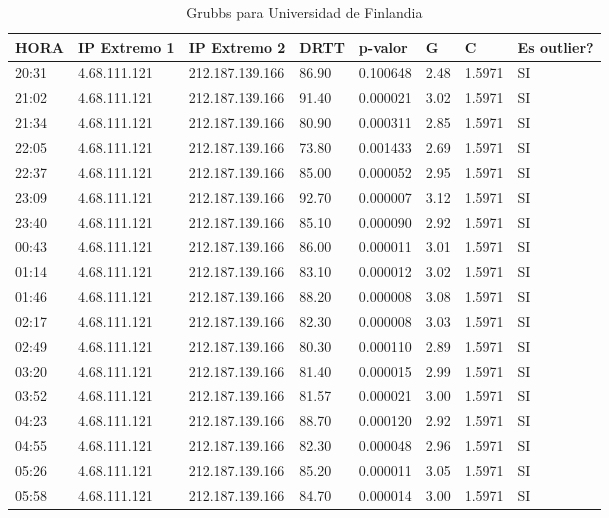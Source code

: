 \begin{table}[H]
	\centering
	\caption{Grubbs para Universidad de Finlandia}
	\label{table:grubbs-inglaterra}
	\begin{tabular}{|l|l|l|l|l|l|l|l|}
		\hline
		HORA & IP Extremo 1 & IP Extremo 2 & DRTT & p-valor & G & C & Es outlier? \\ \hline
		20:31 & 4.68.111.121 & 212.187.139.166 & 86.90 & 0.100648 & 2.48 & 1.5971 & SI \\ \hline
		21:02 & 4.68.111.121 & 212.187.139.166 & 91.40 & 0.000021 & 3.02 & 1.5971 & SI \\ \hline
		21:34 & 4.68.111.121 & 212.187.139.166 & 80.90 & 0.000311 & 2.85 & 1.5971 & SI \\ \hline
		22:05 & 4.68.111.121 & 212.187.139.166 & 73.80 & 0.001433 & 2.69 & 1.5971 & SI \\ \hline
		22:37 & 4.68.111.121 & 212.187.139.166 & 85.00 & 0.000052 & 2.95 & 1.5971 & SI \\ \hline
		23:09 & 4.68.111.121 & 212.187.139.166 & 92.70 & 0.000007 & 3.12 & 1.5971 & SI \\ \hline
		23:40 & 4.68.111.121 & 212.187.139.166 & 85.10 & 0.000090 & 2.92 & 1.5971 & SI \\ \hline
		00:43 & 4.68.111.121 & 212.187.139.166 & 86.00 & 0.000011 & 3.01 & 1.5971 & SI \\ \hline
		01:14 & 4.68.111.121 & 212.187.139.166 & 83.10 & 0.000012 & 3.02 & 1.5971 & SI \\ \hline
		01:46 & 4.68.111.121 & 212.187.139.166 & 88.20 & 0.000008 & 3.08 & 1.5971 & SI \\ \hline
		02:17 & 4.68.111.121 & 212.187.139.166 & 82.30 & 0.000008 & 3.03 & 1.5971 & SI \\ \hline
		02:49 & 4.68.111.121 & 212.187.139.166 & 80.30 & 0.000110 & 2.89 & 1.5971 & SI \\ \hline
		03:20 & 4.68.111.121 & 212.187.139.166 & 81.40 & 0.000015 & 2.99 & 1.5971 & SI \\ \hline
		03:52 & 4.68.111.121 & 212.187.139.166 & 81.57 & 0.000021 & 3.00 & 1.5971 & SI \\ \hline
		04:23 & 4.68.111.121 & 212.187.139.166 & 88.70 & 0.000120 & 2.92 & 1.5971 & SI \\ \hline
		04:55 & 4.68.111.121 & 212.187.139.166 & 82.30 & 0.000048 & 2.96 & 1.5971 & SI \\ \hline
		05:26 & 4.68.111.121 & 212.187.139.166 & 85.20 & 0.000011 & 3.05 & 1.5971 & SI \\ \hline
		05:58 & 4.68.111.121 & 212.187.139.166 & 84.70 & 0.000014 & 3.00 & 1.5971 & SI \\ \hline

\end{tabular}
\end{table}

